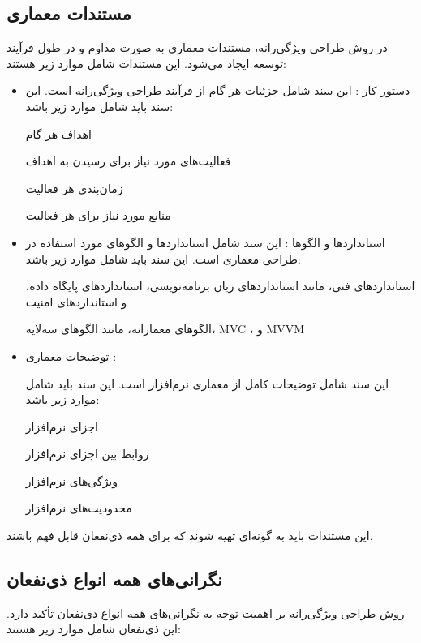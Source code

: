 \subsection*{مستندات معماری}

در روش طراحی ویژگی‌رانه، مستندات معماری به صورت مداوم و در طول فرآیند توسعه ایجاد می‌شود. این مستندات شامل موارد زیر هستند:

\begin{itemize}
	\item دستور کار  : 
	این سند شامل جزئیات هر گام از فرآیند طراحی ویژگی‌رانه است. این سند باید شامل موارد زیر باشد:
	
	اهداف هر گام
	
	فعالیت‌های مورد نیاز برای رسیدن به اهداف
	
	زمان‌بندی هر فعالیت
	
	منابع مورد نیاز برای هر فعالیت
	\item استانداردها و الگوها  :
	این سند شامل استانداردها و الگوهای مورد استفاده در طراحی معماری است. این سند باید شامل موارد زیر باشد:
	
	استانداردهای فنی، مانند استانداردهای زبان برنامه‌نویسی، استانداردهای پایگاه داده، و استانداردهای امنیت
	
	الگوهای معمارانه، مانند الگوهای سه‌لایه، MVC ، و MVVM
	\item توضیحات معماری  :
	
	این سند شامل توضیحات کامل از معماری نرم‌افزار است. این سند باید شامل موارد زیر باشد:
	
	اجزای نرم‌افزار
	
	روابط بین اجزای نرم‌افزار
	
	ویژگی‌های نرم‌افزار
	
	محدودیت‌های نرم‌افزار
\end{itemize}

این مستندات باید به گونه‌ای تهیه شوند که برای همه ذی‌نفعان قابل فهم باشند.

\subsection*{نگرانی‌های همه انواع ذی‌نفعان}

روش طراحی ویژگی‌رانه بر اهمیت توجه به نگرانی‌های همه انواع ذی‌نفعان تأکید دارد. این ذی‌نفعان شامل موارد زیر هستند:

